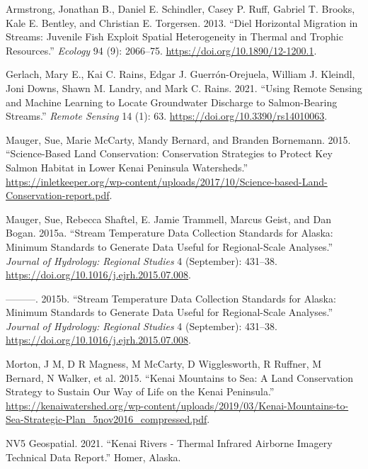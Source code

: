 \documentclass[
  letterpaper,
  DIV=11,
  numbers=noendperiod]{scrreprt}
\newlength{\cslhangindent}
\newlength{\cslentryspacingunit} %
\newenvironment{CSLReferences}[2] %
 {%
  \setlength{\parindent}{0pt}
  \ifodd #1
  \let\oldpar\par
  \def\par{\hangindent=\cslhangindent\oldpar}
  \fi
  \setlength{\parskip}{#2\cslentryspacingunit}
 }%
 {}
\begin{document}
\hypertarget{refs}{}
\begin{CSLReferences}{1}{0}
\leavevmode{}%
Armstrong, Jonathan B., Daniel E. Schindler, Casey P. Ruff, Gabriel T.
Brooks, Kale E. Bentley, and Christian E. Torgersen. 2013. {``Diel
Horizontal Migration in Streams: Juvenile Fish Exploit Spatial
Heterogeneity in Thermal and Trophic Resources.''} \emph{Ecology} 94
(9): 2066--75. \url{https://doi.org/10.1890/12-1200.1}.

\leavevmode{}%
Gerlach, Mary E., Kai C. Rains, Edgar J. Guerrón-Orejuela, William J.
Kleindl, Joni Downs, Shawn M. Landry, and Mark C. Rains. 2021. {``Using
Remote Sensing and Machine Learning to Locate Groundwater Discharge to
Salmon-Bearing Streams.''} \emph{Remote Sensing} 14 (1): 63.
\url{https://doi.org/10.3390/rs14010063}.

\leavevmode{}%
Mauger, Sue, Marie McCarty, Mandy Bernard, and Branden Bornemann. 2015.
{``Science-Based Land Conservation: Conservation Strategies to Protect
Key Salmon Habitat in Lower Kenai Peninsula Watersheds.''}
\url{https://inletkeeper.org/wp-content/uploads/2017/10/Science-based-Land-Conservation-report.pdf}.

\leavevmode{}%
Mauger, Sue, Rebecca Shaftel, E. Jamie Trammell, Marcus Geist, and Dan
Bogan. 2015a. {``Stream Temperature Data Collection Standards for
Alaska: Minimum Standards to Generate Data Useful for Regional-Scale
Analyses.''} \emph{Journal of Hydrology: Regional Studies} 4
(September): 431--38. \url{https://doi.org/10.1016/j.ejrh.2015.07.008}.

\leavevmode{}%
---------. 2015b. {``Stream Temperature Data Collection Standards for
Alaska: Minimum Standards to Generate Data Useful for Regional-Scale
Analyses.''} \emph{Journal of Hydrology: Regional Studies} 4
(September): 431--38. \url{https://doi.org/10.1016/j.ejrh.2015.07.008}.

\leavevmode{}%
Morton, J M, D R Magness, M McCarty, D Wigglesworth, R Ruffner, M
Bernard, N Walker, et al. 2015. {``Kenai Mountains to Sea: A Land
Conservation Strategy to Sustain Our Way of Life on the Kenai
Peninsula.''}
\url{https://kenaiwatershed.org/wp-content/uploads/2019/03/Kenai-Mountains-to-Sea-Strategic-Plan_5nov2016_compressed.pdf}.

\leavevmode{}%
NV5 Geospatial. 2021. {``Kenai Rivers - Thermal Infrared Airborne
Imagery Technical Data Report.''} Homer, Alaska.


\end{CSLReferences}
\end{document}
